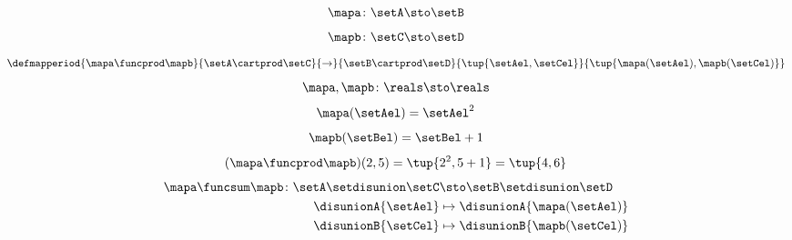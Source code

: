 {\begin{forslides}
        \begin{equation}
            \label{eq:slides_session2_169}
            \mapa\colon \setA \sto \setB
        \end{equation}
        \begin{equation}
            \label{eq:slides_session2_170}
            \mapb\colon \setC \sto \setD
        \end{equation}
        \begin{equation}
            \label{eq:slides_session2_171}
            \defmapperiod{
                \mapa \funcprod \mapb
            }{
                \setA \cartprod \setC
            }{
                \to
            }{
                \setB\cartprod \setD
            }{
                \tup{\setAel, \setCel}
            }{
                \tup{\mapa(\setAel),\mapb(\setCel)}
            }
        \end{equation}
        \begin{equation}
            \label{eq:slides_session2_172}
            \mapa,\mapb\colon \reals \sto \reals
        \end{equation}
        \begin{equation}
            \label{eq:slides_session2_173}
            \mapa(\setAel)=\setAel^2
        \end{equation}
        \begin{equation}
            \label{eq:slides_session2_174}
            \mapb(\setBel)=\setBel+1
        \end{equation}
        \begin{equation}
            \label{eq:slides_session2_175}
            (\mapa \funcprod \mapb)(2,5)=\tup{2^2,5+1}=\tup{4,6}
        \end{equation}
        \begin{equation}
            \label{eq:slides_session2_176}
            \begin{aligned}
                \mapa \funcsum \mapb \colon \setA \setdisunion \setC & \sto \setB\setdisunion \setD \\
                \disunionA{\setAel}                                  & \mapsto \disunionA{\mapa(\setAel)} \\
                \disunionB{\setCel}                                  & \mapsto \disunionB{\mapb(\setCel)} \\
            \end{aligned}
        \end{equation}
        \begin{equation}

\end{equation}
\end{forslides}}
